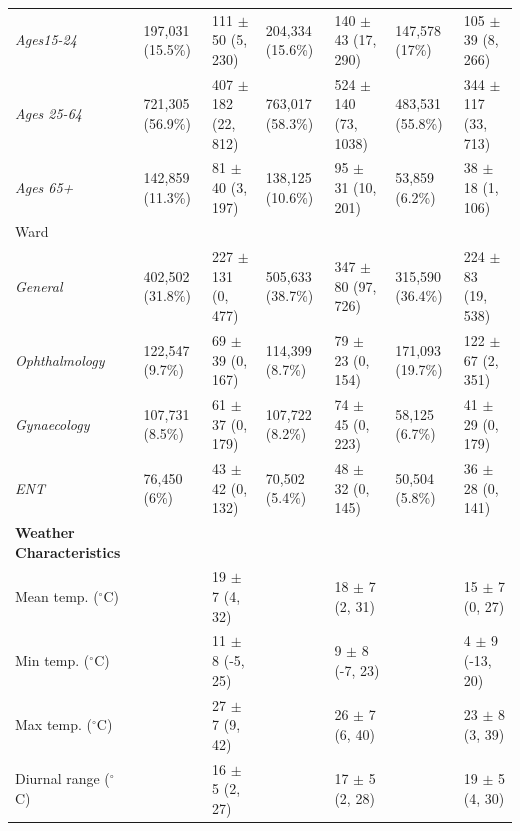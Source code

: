 \begin{longtable}[t]{lllllll}
\hspace{2em}\textit{Ages15-24} & 197,031 (15.5\%) & 111 $\pm$ 50 (5, 230) & 204,334 (15.6\%) & 140 $\pm$ 43 (17, 290) & 147,578 (17\%) & 105 $\pm$ 39 (8, 266)\\
\hspace{2em}\textit{Ages 25-64} & 721,305 (56.9\%) & 407 $\pm$ 182 (22, 812) & 763,017 (58.3\%) & 524 $\pm$ 140 (73, 1038) & 483,531 (55.8\%) & 344 $\pm$ 117 (33, 713)\\
\hspace{2em}\textit{Ages 65+} & 142,859 (11.3\%) & 81 $\pm$ 40 (3, 197) & 138,125 (10.6\%) & 95 $\pm$ 31 (10, 201) & 53,859 (6.2\%) & 38 $\pm$ 18 (1, 106)\\
\hspace{1em}Ward &  &  &  &  &  & \\
\hspace{2em}\textit{General} & 402,502 (31.8\%) & 227 $\pm$ 131 (0, 477) & 505,633 (38.7\%) & 347 $\pm$ 80 (97, 726) & 315,590 (36.4\%) & 224 $\pm$ 83 (19, 538)\\
\hspace{2em}\textit{Ophthalmology} & 122,547 (9.7\%) & 69 $\pm$ 39 (0, 167) & 114,399 (8.7\%) & 79 $\pm$ 23 (0, 154) & 171,093 (19.7\%) & 122 $\pm$ 67 (2, 351)\\
\hspace{2em}\textit{Gynaecology} & 107,731 (8.5\%) & 61 $\pm$ 37 (0, 179) & 107,722 (8.2\%) & 74 $\pm$ 45 (0, 223) & 58,125 (6.7\%) & 41 $\pm$ 29 (0, 179)\\
\hspace{2em}\textit{ENT} & 76,450 (6\%) & 43 $\pm$ 42 (0, 132) & 70,502 (5.4\%) & 48 $\pm$ 32 (0, 145) & 50,504 (5.8\%) & 36 $\pm$ 28 (0, 141)\\
\textbf{Weather Characteristics} &  &  &  &  &  & \\
\hspace{1em}Mean temp. ($^\circ$C) &  & 19 $\pm$ 7 (4, 32) &  & 18 $\pm$ 7 (2, 31) &  & 15 $\pm$ 7 (0, 27)\\
\hspace{1em}Min temp. ($^\circ$C) &  & 11 $\pm$ 8 (-5, 25) &  & 9 $\pm$ 8 (-7, 23) &  & 4 $\pm$ 9 (-13, 20)\\
\hspace{1em}Max temp. ($^\circ$C) &  & 27 $\pm$ 7 (9, 42) &  & 26 $\pm$ 7 (6, 40) &  & 23 $\pm$ 8 (3, 39)\\
\hspace{1em}Diurnal range ($^\circ$C) &  & 16 $\pm$ 5 (2, 27) &  & 17 $\pm$ 5 (2, 28) &  & 19 $\pm$ 5 (4, 30)\\

\end{longtable}
